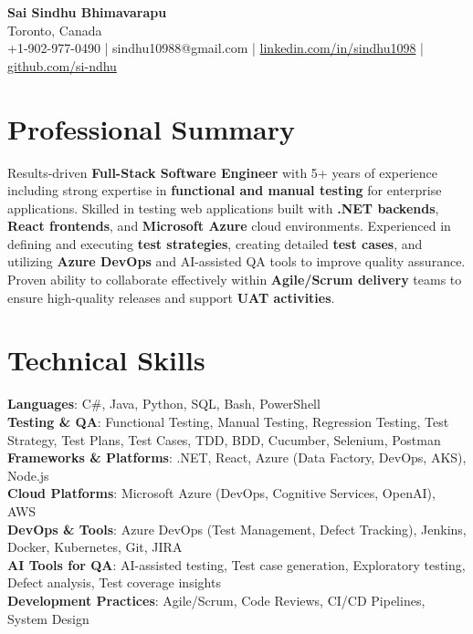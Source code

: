 \documentclass[letterpaper,11pt]{article}
\begin{document}
\begin{center}
  {\Large \textbf{Sai Sindhu Bhimavarapu}} \\
  Toronto, Canada \\
  +1-902-977-0490 \enspace | \enspace sindhu10988@gmail.com \enspace | \enspace \href{https://www.linkedin.com/in/sindhu1098/}{linkedin.com/in/sindhu1098} \enspace | \enspace \href{https://github.com/si-ndhu}{github.com/si-ndhu}
\end{center}

\section{Professional Summary}
  \begin{itemize}[leftmargin=0.15in, label={}]
    \small{\item{
     Results-driven \textbf{Full-Stack Software Engineer} with 5+ years of experience including strong expertise in \textbf{functional and manual testing} for enterprise applications. Skilled in testing web applications built with \textbf{.NET backends}, \textbf{React frontends}, and \textbf{Microsoft Azure} cloud environments. Experienced in defining and executing \textbf{test strategies}, creating detailed \textbf{test cases}, and utilizing \textbf{Azure DevOps} and AI-assisted QA tools to improve quality assurance. Proven ability to collaborate effectively within \textbf{Agile/Scrum delivery} teams to ensure high-quality releases and support \textbf{UAT activities}.
    }}
  \end{itemize}
\vspace{-16pt}

\section{Technical Skills}
 \begin{itemize}[leftmargin=0.15in, label={}]
    \small{\item{
     \textbf{Languages}: C\#, Java, Python, SQL, Bash, PowerShell \\
     \textbf{Testing \& QA}: Functional Testing, Manual Testing, Regression Testing, Test Strategy, Test Plans, Test Cases, TDD, BDD, Cucumber, Selenium, Postman \\
     \textbf{Frameworks \& Platforms}: .NET, React, Azure (Data Factory, DevOps, AKS), Node.js \\
     \textbf{Cloud Platforms}: Microsoft Azure (DevOps, Cognitive Services, OpenAI), AWS \\
     \textbf{DevOps \& Tools}: Azure DevOps (Test Management, Defect Tracking), Jenkins, Docker, Kubernetes, Git, JIRA \\
     \textbf{AI Tools for QA}: AI-assisted testing, Test case generation, Exploratory testing, Defect analysis, Test coverage insights \\
     \textbf{Development Practices}: Agile/Scrum, Code Reviews, CI/CD Pipelines, System Design
    }}
 \end{itemize}
\vspace{-16pt}
\end{document}
